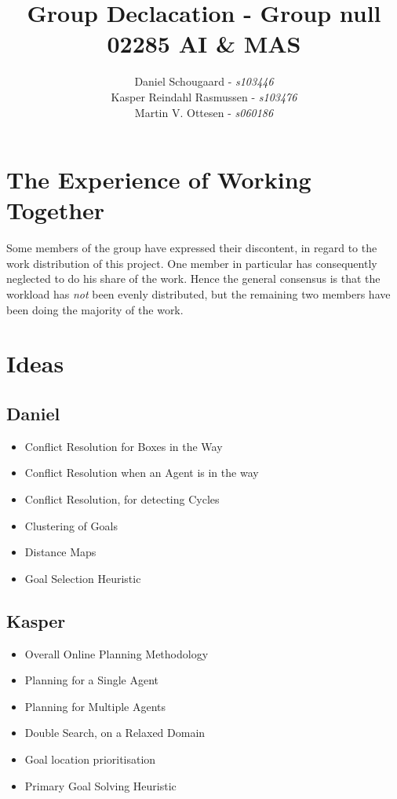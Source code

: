 \documentclass[10pt,a4paper]{article}
\title{Group Declacation - Group null\\ 02285 AI \& MAS}
\author{
	Daniel Schougaard - \textit{s103446} \\
 	Kasper Reindahl Rasmussen - \textit{s103476} \\
 	Martin V. Ottesen - \textit{s060186}
 }
\begin{document}
\clearpage\maketitle
\thispagestyle{empty}

\section*{The Experience of Working Together}
	Some members of the group have expressed their discontent, in regard to the work distribution of this project. One member in particular has consequently neglected to do his share of the work. Hence the general consensus is that the workload has \emph{not} been evenly distributed, but the remaining two members have been doing the majority of the work.
\pagebreak
\pagestyle{plain}

\section{Ideas}
	\subsection{Daniel}
		\begin{itemize}	
			\item Conflict Resolution for Boxes in the Way
			\item Conflict Resolution when an Agent is in the way
			\item Conflict Resolution, for detecting Cycles
			\item Clustering of Goals
			\item Distance Maps
			\item Goal Selection Heuristic
		\end{itemize}
	\subsection{Kasper}
		\begin{itemize}	
			\item Overall Online Planning Methodology
			\item Planning for a Single Agent
			\item Planning for Multiple Agents
			\item Double Search, on a Relaxed Domain
			\item Goal location prioritisation
			\item Primary Goal Solving Heuristic
		\end{itemize}
\end{document}

